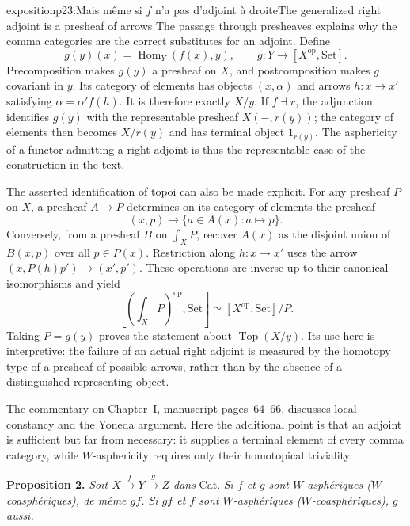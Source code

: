 \begin{dcomment}{exposition}{p23:Mais même si $f$ n'a pas d'adjoint à droite}{The generalized right adjoint is a presheaf of arrows}
The passage through presheaves explains why the comma categories are the correct substitutes for an adjoint. Define
\[
 g(y)(x)=\operatorname{Hom}_Y(f(x),y),\qquad
 g:Y\longrightarrow [X^{\mathrm{op}},\mathrm{Set}].
\]
Precomposition makes $g(y)$ a presheaf on $X$, and postcomposition makes $g$ covariant in $y$. Its category of elements has objects $(x,\alpha)$ and arrows $h:x\to x'$ satisfying $\alpha=\alpha'f(h)$. It is therefore exactly $X/y$. If $f\dashv r$, the adjunction identifies $g(y)$ with the representable presheaf $X(-,r(y))$; the category of elements then becomes $X/r(y)$ and has terminal object $1_{r(y)}$. The asphericity of a functor admitting a right adjoint is thus the representable case of the construction in the text.

The asserted identification of topoi can also be made explicit. For any presheaf $P$ on $X$, a presheaf $A\to P$ determines on its category of elements the presheaf
\[
 (x,p)\longmapsto\{a\in A(x):a\mapsto p\}.
\]
Conversely, from a presheaf $B$ on $\int_X P$, recover $A(x)$ as the disjoint union of $B(x,p)$ over all $p\in P(x)$. Restriction along $h:x\to x'$ uses the arrow $(x,P(h)p')\to(x',p')$. These operations are inverse up to their canonical isomorphisms and yield
\[
 [ (\textstyle\int_X P)^{\mathrm{op}},\mathrm{Set}]
 \simeq [X^{\mathrm{op}},\mathrm{Set}]/P.
\]
Taking $P=g(y)$ proves the statement about $\operatorname{Top}(X/y)$. Its use here is interpretive: the failure of an actual right adjoint is measured by the homotopy type of a presheaf of possible arrows, rather than by the absence of a distinguished representing object.

The commentary on Chapter~I, manuscript pages~64--66, discusses local constancy and the Yoneda argument. Here the additional point is that an adjoint is sufficient but far from necessary: it supplies a terminal element of every comma category, while $W$-asphericity requires only their homotopical triviality.
\end{dcomment}


\textbf{Proposition 2.} \textit{Soit $X \xrightarrow{f} Y \xrightarrow{g} Z$ dans} \textup{Cat}. \textit{Si $f$ et $g$ sont $W$-asphériques ($W$-coasphériques), de même $gf$. Si $gf$ et $f$ sont $W$-asphériques ($W$-coasphériques), $g$ aussi.}

